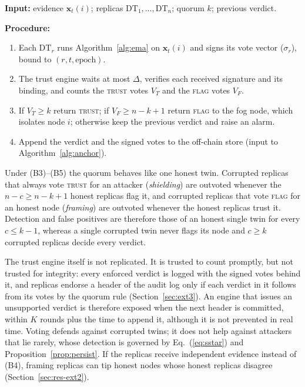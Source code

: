 \begin{algorithm}[!t]
\caption{Per-round vote for node $i$.}
\label{alg:vote}
\noindent\textbf{Input:} evidence $\mathbf{x}_t(i)$; replicas
$\mathrm{DT}_1,\dots,\mathrm{DT}_n$; quorum $k$; previous verdict.

\noindent\textbf{Procedure:}
\begin{enumerate}\setlength{\itemsep}{0pt}\setlength{\parskip}{0pt}
  \item Each $\mathrm{DT}_r$ runs Algorithm~\ref{alg:ema} on
        $\mathbf{x}_t(i)$ and signs its vote vector ($\sigma_r$),
        bound to $(r,t,\text{epoch})$.
  \item The trust engine waits at most $\Delta$, verifies each received
        signature and its binding, and counts the \textsc{trust} votes
        $V_T$ and the \textsc{flag} votes $V_F$.
  \item If $V_T\geq k$ return \textsc{trust}; if $V_F\geq n-k+1$ return
        \textsc{flag} to the fog node, which isolates node $i$;
        otherwise keep the previous verdict and raise an alarm.
  \item Append the verdict and the signed votes to the off-chain store
        (input to Algorithm~\ref{alg:anchor}).
\end{enumerate}
\end{algorithm}

Under (B3)--(B5) the quorum behaves like one honest twin.  Corrupted
replicas that always vote \textsc{trust} for an attacker
(\emph{shielding}) are outvoted whenever the $n-c\geq n-k+1$ honest
replicas flag it, and corrupted replicas that vote \textsc{flag} for an
honest node (\emph{framing}) are outvoted whenever the honest replicas
trust it.  Detection and false positives are therefore those of an
honest single twin for every $c\le k-1$, whereas a single corrupted
twin never flags its node and $c\geq k$ corrupted replicas decide every
verdict.

The trust engine itself is not replicated.  It is trusted to count
promptly, but not trusted for integrity: every enforced verdict is
logged with the signed votes behind it, and replicas endorse a header
of the audit log only if each verdict in it follows from its votes by
the quorum rule (Section~\ref{sec:ext3}).  An engine that issues an
unsupported verdict is therefore exposed when the next header is
committed, within $K$ rounds plus the time to append it, although it
is not prevented in real time.  Voting defends
against corrupted twins; it does not help against attackers that lie
rarely, whose detection is governed by
Eq.~(\ref{eq:sstar}) and Proposition~\ref{prop:persist}.
If the replicas receive independent evidence instead of (B4), framing
replicas can tip honest nodes whose honest replicas disagree
(Section~\ref{sec:res-ext2}).

